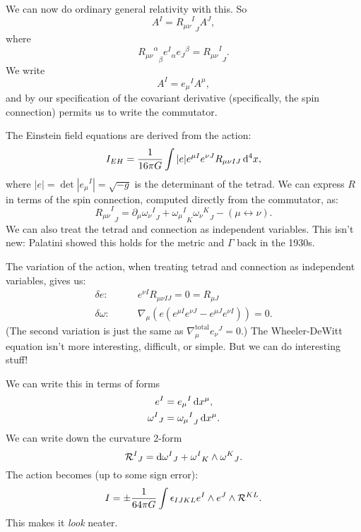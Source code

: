 We can now do ordinary general relativity with this. So
\begin{equation}
[\nabla_{\mu},\nabla_{\nu}]A^{I} = {{R_{\mu\nu}}^{I}}_{J}A^{J},
\end{equation}
where
\begin{equation}
{{R_{\mu\nu}}^{\alpha}}_{\beta}{e^{I}}_{\alpha}{e_{J}}^{\beta} = {{R_{\mu\nu}}^{I}}_{J}.
\end{equation}
We write
\begin{equation}
A^{I} = {e_{\mu}}^{I}A^{\mu},
\end{equation}
and by our specification of the covariant derivative (specifically, the
spin connection) permits us to write the commutator.

The Einstein field equations are derived from the action:
\begin{equation}
I_{EH} = \frac{1}{16\pi G}\int|e|e^{\mu I}e^{\nu J}R_{\mu\nu I J}\,\mathrm{d}^{4}x,
\end{equation}
where $|e| = \det|{e_{\mu}}^{I}|=\sqrt{-g}$ is the determinant of the
tetrad. We can express $R$ in terms of the spin connection, computed
directly from the commutator, as:
\begin{equation}
  {{R_{\mu\nu}}^{I}}_{J} = \partial_{\mu}{{\omega_{\nu}}^{I}}_{J}
  +{{\omega_{\mu}}^{I}}_{K}{{\omega_{\nu}}^{K}}_{J} - (\mu\leftrightarrow\nu).
\end{equation}
We can also treat the tetrad and connection as independent variables.
This isn't new: Palatini showed this holds for the metric and $\Gamma$
back in the 1930s.

The variation of the action, when treating tetrad and connection as
independent variables, gives us:
\begin{equation}
  \begin{split}
    \delta e: &\qquad e^{\nu I}R_{\mu\nu I J} = 0 = R_{\mu J}\\
    \delta\omega : &\qquad \nabla_{\mu}(e(e^{\mu I}e^{\nu J} - e^{\mu J}e^{\nu I})) = 0.
  \end{split}
\end{equation}
(The second variation is just the same as $\nabla^{\text{total}}_{\mu}{e_{\nu}}^{J}=0$.)
The Wheeler-DeWitt equation isn't more interesting, difficult, or
simple. But we can do interesting stuff!

We can write this in terms of forms
\begin{subequations}
\begin{align}
  e^{I} &= {e_{\mu}}^{I}\,\mathrm{d} x^{\mu},\\
  {\omega^{I}}_{J} &= {{\omega_{\mu}}^{I}}_{J}\,\mathrm{d} x^{\mu}.
\end{align}
\end{subequations}
We can write down the curvature 2-form
\begin{equation}
{\mathcal{R}^{I}}_{J} = \mathrm{d}{\omega^{I}}_{J} + {\omega^{I}}_{K}\wedge{\omega^{K}}_{J}.
\end{equation}
The action becomes (up to some sign error):
\begin{equation}
I = \pm\frac{1}{64\pi G}\int\epsilon_{IJKL}e^{I}\wedge e^{J}\wedge\mathcal{R}^{KL}.
\end{equation}
This makes it \emph{look} neater.

